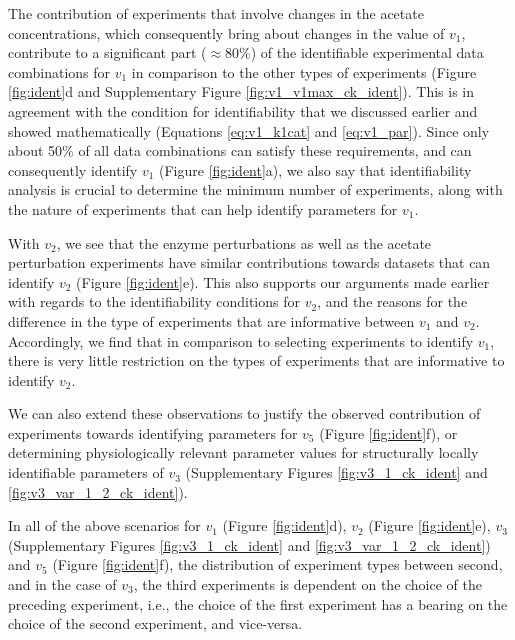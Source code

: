 \documentclass[10pt]{article}
\begin{document}
	The contribution of experiments that involve changes in the acetate concentrations, which consequently bring about changes in the value of $v_1$, contribute to a significant part ($\approx$80\%) of the identifiable experimental data combinations for $v_1$ in comparison to the other types of experiments (Figure \ref{fig:ident}d and Supplementary Figure \ref{fig:v1_v1max_ck_ident}). This is in agreement with the condition for identifiability that we discussed earlier and showed mathematically (Equations \ref{eq:v1_k1cat} and \ref{eq:v1_par}). Since only about 50\% of all data combinations can satisfy these requirements, and can consequently identify $v_1$ (Figure \ref{fig:ident}a), we also say that identifiability analysis is crucial to determine the minimum number of experiments, along with the nature of experiments that can help identify parameters for $v_1$. 
	
	With $v_2$, we see that the enzyme perturbations as well as the acetate perturbation experiments have similar contributions towards datasets that can identify $v_2$ (Figure \ref{fig:ident}e). This also supports our arguments made earlier with regards to the identifiability conditions for $v_2$, and the reasons for the difference in the type of experiments that are informative between $v_1$ and $v_2$. Accordingly, we find that in comparison to selecting experiments to identify $v_1$, there is very little restriction on the types of experiments that are informative to identify $v_2$.
	
	We can also extend these observations to justify the observed contribution of experiments towards identifying parameters for $v_5$ (Figure \ref{fig:ident}f), or determining physiologically relevant parameter values for structurally locally identifiable parameters of $v_3$ (Supplementary Figures \ref{fig:v3_1_ck_ident} and \ref{fig:v3_var_1_2_ck_ident}). 
	
	In all of the above scenarios for $v_1$ (Figure \ref{fig:ident}d), $v_2$ (Figure \ref{fig:ident}e), $v_3$ (Supplementary Figures \ref{fig:v3_1_ck_ident} and \ref{fig:v3_var_1_2_ck_ident}) and $v_5$ (Figure \ref{fig:ident}f), the distribution of experiment types between second, and in the case of $v_3$, the third experiments is dependent on the choice of the preceding experiment, i.e., the choice of the first experiment has a bearing on the choice of the second experiment, and vice-versa. 
	
\end{document}
